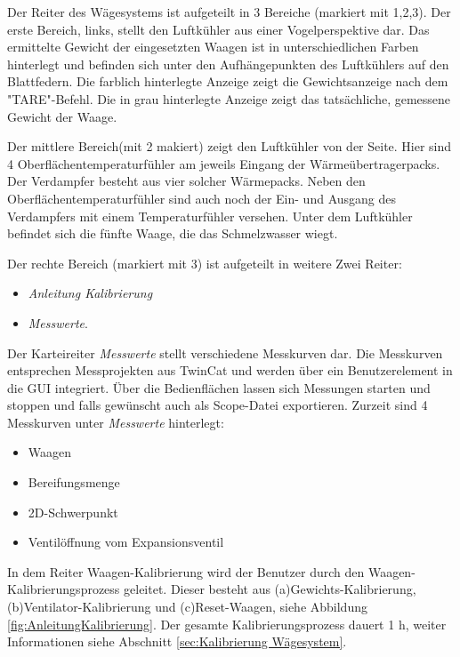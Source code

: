 Der Reiter des Wägesystems ist aufgeteilt in 3 Bereiche (markiert mit 1,2,3). Der erste Bereich, links, stellt den Luftkühler aus einer Vogelperspektive dar. Das ermittelte Gewicht der eingesetzten Waagen ist in unterschiedlichen Farben hinterlegt und befinden sich unter den Aufhängepunkten des Luftkühlers auf den Blattfedern. Die farblich hinterlegte Anzeige zeigt die Gewichtsanzeige nach dem "TARE"-Befehl. Die in grau hinterlegte Anzeige zeigt das tatsächliche, gemessene Gewicht der Waage. 

Der mittlere Bereich(mit 2 makiert) zeigt den Luftkühler von der Seite. Hier sind 4 Oberflächentemperaturfühler am jeweils Eingang der Wärmeübertragerpacks. Der Verdampfer besteht aus vier solcher Wärmepacks. Neben den Oberflächentemperaturfühler sind auch noch der Ein- und Ausgang des Verdampfers mit einem Temperaturfühler versehen. Unter dem Luftkühler befindet sich die fünfte Waage, die das Schmelzwasser wiegt. 

Der rechte Bereich (markiert mit 3) ist aufgeteilt in weitere Zwei Reiter:
\begin{itemize}
\item	\textit{Anleitung Kalibrierung}
\item	\textit{Messwerte}.	
\end{itemize}


Der Karteireiter \textit{Messwerte} stellt verschiedene Messkurven dar. Die Messkurven entsprechen Messprojekten aus TwinCat und werden über ein Benutzerelement in die GUI integriert. Über die Bedienflächen lassen sich Messungen starten und stoppen und falls gewünscht auch als Scope-Datei exportieren. Zurzeit sind 4 Messkurven unter \textit{Messwerte} hinterlegt:

\begin{itemize}
\item	Waagen
\item	Bereifungsmenge
\item	2D-Schwerpunkt
\item 	Ventilöffnung vom Expansionsventil
\end{itemize}

In dem Reiter Waagen-Kalibrierung wird der Benutzer durch den Waagen-Kalibrierungsprozess geleitet. Dieser besteht aus (a)Gewichts-Kalibrierung, (b)Ventilator-Kalibrierung und (c)Reset-Waagen, siehe Abbildung \ref{fig:AnleitungKalibrierung}.  Der gesamte Kalibrierungsprozess dauert 1 h, weiter Informationen siehe Abschnitt \ref{sec:Kalibrierung Wägesystem}. 



